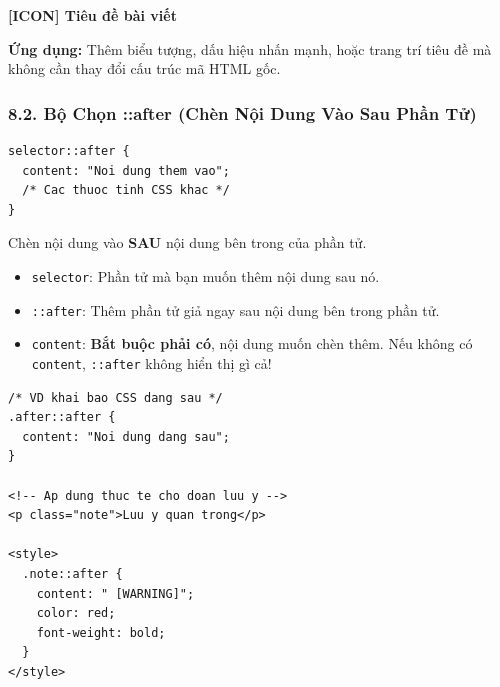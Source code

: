 \documentclass[11pt,oneside]{book}
\newcommand{\codeinline}[1]{\textcolor{accentOrange}{\texttt{#1}}}
\begin{document}
\begin{browserWindow}
\sffamily\Large\bfseries
[ICON] Tiêu đề bài viết
\end{browserWindow}

\begin{conceptBox}
\textbf{Ứng dụng:} Thêm biểu tượng, dấu hiệu nhấn mạnh, hoặc trang trí tiêu đề mà không cần thay đổi cấu trúc mã HTML gốc.
\end{conceptBox}

\subsubsection{8.2. Bộ Chọn ::after (Chèn Nội Dung Vào Sau Phần Tử)}

\begin{codeWindow}
\begin{lstlisting}[language=CSS3]
selector::after {
  content: "Noi dung them vao";
  /* Cac thuoc tinh CSS khac */
}
\end{lstlisting}
\end{codeWindow}

\begin{conceptBox}
Chèn nội dung vào \textbf{SAU} nội dung bên trong của phần tử.
\begin{itemize}[leftmargin=1.5em, itemsep=3pt, parsep=0pt]
    \item \codeinline{selector}: Phần tử mà bạn muốn thêm nội dung sau nó.
    \item \codeinline{::after}: Thêm phần tử giả ngay sau nội dung bên trong phần tử.
    \item \codeinline{content}: \textbf{Bắt buộc phải có}, nội dung muốn chèn thêm. Nếu không có \codeinline{content}, \codeinline{::after} không hiển thị gì cả!
\end{itemize}
\end{conceptBox}

\begin{codeWindow}
\begin{lstlisting}[language=HTML5]
/* VD khai bao CSS dang sau */
.after::after {
  content: "Noi dung dang sau";
}

<!-- Ap dung thuc te cho doan luu y -->
<p class="note">Luu y quan trong</p>

<style>
  .note::after {
    content: " [WARNING]";
    color: red;
    font-weight: bold;
  }
</style>
\end{lstlisting}
\end{codeWindow}
\end{document}
